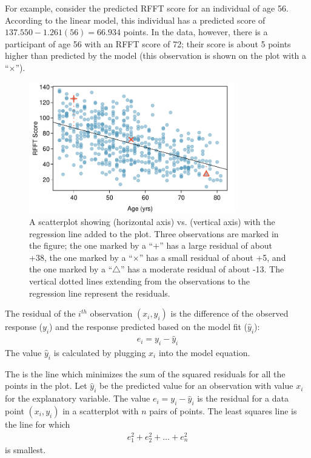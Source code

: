 For example, consider the predicted RFFT score for an individual of age 56. According to the linear model, this individual has a predicted score of $137.550 - 1.261(56) = 66.934$ points. In the data, however, there is a participant of age 56 with an RFFT score of 72; their score is about 5 points higher than predicted by the model (this observation is shown on the plot with a ``$\times$'').

\begin{figure}[h!]
	\centering
	\includegraphics[width=0.8\textwidth]
	{ch_simple_linear_regression_oi_biostat/figures/prevendResid/prevendResid.pdf}
	\caption{A scatterplot showing  (horizontal axis) vs.  (vertical axis) with the regression line added to the plot. Three observations are marked in the figure; the one marked by a ``$+$'' has a large residual of about +38, the one marked by a ``$\times$'' has a small residual of about +5, and the one marked by a ``$\triangle$'' has a moderate residual of about -13. The vertical dotted lines extending from the observations to the regression line represent the residuals.}
	\label{prevendResid}
\end{figure}

\begin{termBox}{
The residual of the $i^{th}$ observation $(x_i, y_i)$ is the difference of the observed response ($y_i$) and the response predicted based on the model fit ($\widehat{y}_i$):
\begin{eqnarray*}
e_i = y_i - \widehat{y}_i
\end{eqnarray*}
The value $\widehat{y}_i$ is calculated by plugging $x_i$ into the model equation.}
\end{termBox}

The  is the line which minimizes the sum of the squared residuals for all the points in the plot.  Let $\hat{y}_i$ be the predicted value for an observation with value $x_i$ for the explanatory variable.  The value $e_i = y_i - \hat{y}_i$ is the residual for a data point $(x_i, y_i)$ in a scatterplot with $n$ pairs of points.  The least squares line is the line for which
\begin{eqnarray}
e_{1}^2 + e_{2}^2 + \dots + e_{n}^2
\label{sumOfSquaresForResiduals}
\end{eqnarray}
is smallest. 

